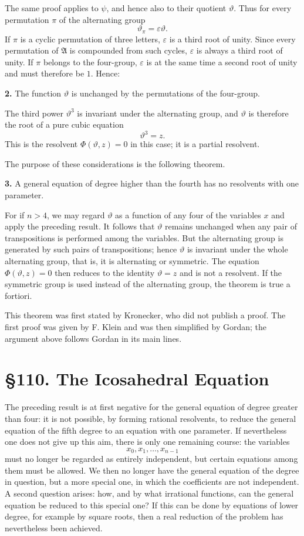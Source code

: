\documentclass[11pt,a4paper]{book}
\newcommand{\webersection}[2]{\clearpage\section*{\S #1. #2}}
\newcommand{\A}{\mathfrak A}
\begin{document}
The same proof applies to $\psi$, and hence also to their quotient $\vartheta$.  Thus for every permutation $\pi$ of the alternating group
\begin{equation}
 \vartheta_\pi=\varepsilon\vartheta.
\end{equation}
If $\pi$ is a cyclic permutation of three letters, $\varepsilon$ is a third root of unity.  Since every permutation of $\A$ is compounded from such cycles, $\varepsilon$ is always a third root of unity.  If $\pi$ belongs to the four-group, $\varepsilon$ is at the same time a second root of unity and must therefore be $1$.  Hence:

\textbf{2.} The function $\vartheta$ is unchanged by the permutations of the four-group.

The third power $\vartheta^3$ is invariant under the alternating group, and $\vartheta$ is therefore the root of a pure cubic equation
\[
 \vartheta^3=z.
\]
This is the resolvent $\Phi(\vartheta,z)=0$ in this case; it is a partial resolvent.

The purpose of these considerations is the following theorem.

\textbf{3.} A general equation of degree higher than the fourth has no resolvents with one parameter.

For if $n>4$, we may regard $\vartheta$ as a function of any four of the variables $x$ and apply the preceding result.  It follows that $\vartheta$ remains unchanged when any pair of transpositions is performed among the variables.  But the alternating group is generated by such pairs of transpositions; hence $\vartheta$ is invariant under the whole alternating group, that is, it is alternating or symmetric.  The equation $\Phi(\vartheta,z)=0$ then reduces to the identity $\vartheta=z$ and is not a resolvent.  If the symmetric group is used instead of the alternating group, the theorem is true a fortiori.

This theorem was first stated by Kronecker, who did not publish a proof.  The first proof was given by F. Klein and was then simplified by Gordan; the argument above follows Gordan in its main lines.

\webersection{110}{The Icosahedral Equation}

The preceding result is at first negative for the general equation of degree greater than four: it is not possible, by forming rational resolvents, to reduce the general equation of the fifth degree to an equation with one parameter.  If nevertheless one does not give up this aim, there is only one remaining course: the variables
\[
 x_0,x_1,
\ldots,x_{n-1}
\]
must no longer be regarded as entirely independent, but certain equations among them must be allowed.  We then no longer have the general equation of the degree in question, but a more special one, in which the coefficients are not independent.  A second question arises: how, and by what irrational functions, can the general equation be reduced to this special one?  If this can be done by equations of lower degree, for example by square roots, then a real reduction of the problem has nevertheless been achieved.
\end{document}
